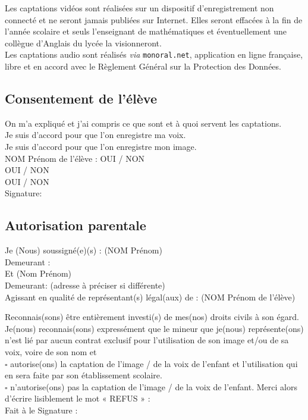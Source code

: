 \documentclass[10pt, a4paper,article]{nsi}
\begin{document}
Les captations vidéos sont réalisées sur un dispositif d'enregistrement non connecté et ne seront jamais publiées sur Internet. Elles seront effacées à la fin de l'année scolaire et seuls l'enseignant de mathématiques et éventuellement une collègue d'Anglais du lycée la visionneront.\\
Les captations audio sont réalisés \textit{via} \texttt{monoral.net}, application en ligne française, libre et en accord avec le Règlement Général sur la Protection des Données.
\subsection*{Consentement de l'élève}

\dleft{14cm}
{On m'a expliqué et j'ai compris ce que sont et à quoi servent les captations.\\
Je suis d'accord pour que l'on enregistre ma voix.\\
Je suis d'accord pour que l'on enregistre mon image.\\
NOM Prénom de l'élève :}
{
OUI / NON\\
OUI / NON\\
OUI / NON\\
Signature:
}

\subsection*{Autorisation parentale}
Je (Nous) soussigné(e)(s) : {\scriptsize(NOM Prénom)}  \\
Demeurant : \\
Et  {\scriptsize(Nom Prénom)}\\
Demeurant: {\scriptsize(adresse à préciser si différente)}\\
Agissant en qualité de représentant(s) légal(aux) de : {\scriptsize(NOM Prénom de l'élève)}

Reconnais(sons) être entièrement investi(s) de mes(nos) droits civils à son égard. Je(nous) reconnais(sons) expressément que le mineur que je(nous) représente(ons) n'est lié par aucun contrat exclusif pour l'utilisation de son image et/ou de sa voix, voire de son nom et\\

$\square$  autorise(ons) la captation de l'image / de la voix de l'enfant et l'utilisation qui en sera faite par son établissement scolaire.\\
    
$\square$ n'autorise(ons) pas la captation de l'image / de la voix de l'enfant. Merci alors d'écrire lisiblement le mot « REFUS » : \\


Fait à \hspace*{5cm} le \hspace*{7.5cm} Signature : 
\end{document}
